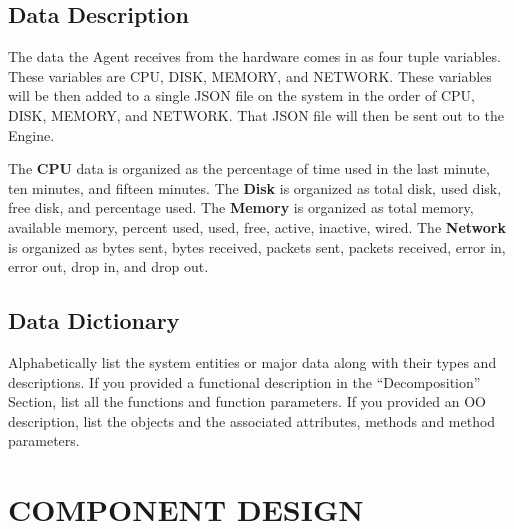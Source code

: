 \documentclass[letterpaper,12pt,oneside,listof=totoc]{scrreprt}
\begin{document}
\section{Data Description}
The data the Agent receives from the hardware comes in as four tuple variables. These variables are CPU, DISK, MEMORY, and NETWORK. These variables will be then added to a single JSON file on the system in the order of CPU, DISK, MEMORY, and NETWORK. That JSON file will then be sent out to the Engine.

The \textbf{CPU} data is organized as the percentage of time used in the last minute, ten minutes, and fifteen minutes.
The \textbf{Disk} is organized as total disk, used disk, free disk, and percentage used.
The \textbf{Memory} is organized as total memory, available memory, percent used, used, free, active, inactive, wired.
The \textbf{Network} is organized as bytes sent, bytes received, packets sent, packets received, error in, error out, drop in, and drop out.



\section{Data Dictionary}

Alphabetically list the system entities or major data along with their types and descriptions. If you provided a functional description in the ``Decomposition'' Section, list all the functions and function parameters. If you provided an OO description, list the objects and the associated attributes, methods and method parameters.


\chapter{COMPONENT DESIGN}

\end{document}
